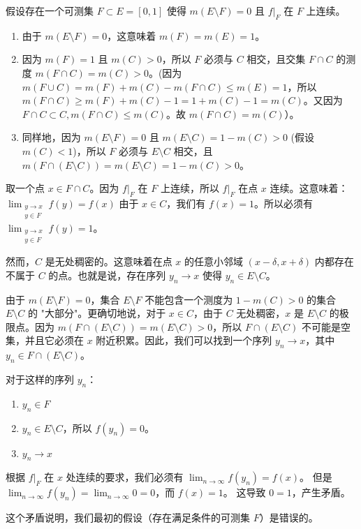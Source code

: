 假设存在一个可测集 $F \subset E=[0,1]$ 使得 $m(E \setminus F)=0$ 且 $f|_F$ 在 $F$ 上连续。

\begin{enumerate}
	\item 由于 $m(E \setminus F)=0$，这意味着 $m(F)=m(E)=1$。
	\item 因为 $m(F)=1$ 且 $m(C)>0$，所以 $F$ 必须与 $C$ 相交，且交集 $F \cap C$ 的测度 $m(F \cap C)=m(C)>0$。(因为 $m(F \cup C)=m(F)+m(C)-m(F \cap C) \leq m(E)=1$，所以 $m(F \cap C) \geq m(F)+m(C)-1=1+m(C)-1=m(C)$。又因为 $F \cap C \subset C, m(F \cap C) \leq m(C)$。故 $m(F \cap C)=m(C)$）。
	\item 同样地，因为 $m(E \setminus F)=0$ 且 $m(E \setminus C)=1-m(C)>0$ (假设 $m(C)<1$)，所以 $F$ 必须与 $E \setminus C$ 相交，且 $m(F \cap (E \setminus C))=m(E \setminus C)=1-m(C)>0$。
\end{enumerate}

取一个点 $x \in F \cap C$。因为 $f|_F$ 在 $F$ 上连续，所以 $f|_F$ 在点 $x$ 连续。这意味着：$\lim_{\substack{y \to x \\ y \in F}} f(y)=f(x)$ 由于 $x \in C$，我们有 $f(x)=1$。所以必须有 $\lim_{\substack{y \to x \\ y \in F}} f(y)=1$。

然而，$C$ 是无处稠密的。这意味着在点 $x$ 的任意小邻域 $(x-\delta, x+\delta)$ 内都存在不属于 $C$ 的点。也就是说，存在序列 $y_n \to x$ 使得 $y_n \in E \setminus C$。

由于 $m(E \setminus F)=0$，集合 $E \setminus F$ 不能包含一个测度为 $1-m(C)>0$ 的集合 $E \setminus C$ 的 "大部分"。更确切地说，对于 $x \in C$，由于 $C$ 无处稠密，$x$ 是 $E \setminus C$ 的极限点。因为 $m(F \cap (E \setminus C))=m(E \setminus C)>0$，所以 $F \cap (E \setminus C)$ 不可能是空集，并且它必须在 $x$ 附近积累。因此，我们可以找到一个序列 $y_n \to x$，其中 $y_n \in F \cap (E \setminus C)$。

对于这样的序列 $y_n$：

\begin{enumerate}
	\item $y_n \in F$
	\item $y_n \in E \setminus C$，所以 $f(y_n)=0$。
	\item $y_n \to x$
\end{enumerate}

根据 $f|_F$ 在 $x$ 处连续的要求，我们必须有 $\lim_{n \to \infty} f(y_n)=f(x)$。 但是 $\lim_{n \to \infty} f(y_n)=\lim_{n \to \infty} 0=0$，而 $f(x)=1$。 这导致 $0=1$，产生矛盾。

这个矛盾说明，我们最初的假设（存在满足条件的可测集 $F$）是错误的。

